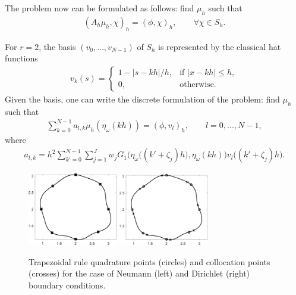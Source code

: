The problem now can be formulated as follows: find $\mu_h$ such that 
\begin{align*}
	(A_h \mu_h, \chi)_h = (\phi,\chi)_h,
	\qquad
	\forall \chi \in S_h.
\end{align*}

For $r=2$, the basis $(v_0,...,v_{N-1})$ of $S_h$ is represented by the classical hat functions
\begin{align} \label{eq:basis_fun}
	v_k(s) = 
	\begin{cases}
		1 - |s-kh| / h, & \text{if } |x-kh| \leq h,
		\\
		0, & \text{otherwise}.
	\end{cases}
\end{align}
Given the basis, one can write the discrete formulation of the problem: find $\mu_h$ such that
\begin{align} \label{eq:lin_system}
	\sum_{k=0}^{N-1} a_{l,k} \mu_h(\eta_{\omega}(kh)) = (\phi,v_l)_h,
	\qquad
	l = 0,...,N-1,
\end{align}
where
\begin{align*}
	a_{l,k} =
	h^2 \sum_{k'=0}^{N-1} \sum_{j=1}^{J} w_j G_1\Big( \eta_{\omega}\big((k'+\zeta_j)h\big), \eta_{\omega}(kh) \Big) {v_l}\big((k'+\zeta_j)h\big).
\end{align*}


\begin{figure}[t!]
	\centering
    \includegraphics[width=0.35\textwidth]{collocation_points3}
    \qquad
    \includegraphics[width=0.35\textwidth]{collocation_points2}
	\caption{ Trapezoidal rule quadrature points (circles) and collocation points (crosses) for the case of Neumann (left) and Dirichlet (right) boundary conditions. }
	\label{fig:colloc_points}
\end{figure}


